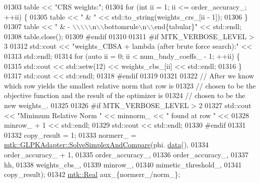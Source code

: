 \begin{DoxyCode}
{{01303     table << \textcolor{stringliteral}{"CRS weights:"};
01304     \textcolor{keywordflow}{for} (\textcolor{keywordtype}{int} ii = 1; ii <= order\_accuracy\_; ++ii) \{
01305       table << \textcolor{stringliteral}{" & "} << std::to\_string(weights\_crs\_[ii - 1]);
01306     \}
01307     table << \textcolor{stringliteral}{" & - \(\backslash\)\(\backslash\)\(\backslash\)\(\backslash\)\(\backslash\)n\(\backslash\)\(\backslash\)bottomrule\(\backslash\)n\(\backslash\)\(\backslash\)end\{tabular\}"} << std::endl;
01308     table.close();
01309 \textcolor{preprocessor}{    #endif}
01310 
01311 \textcolor{preprocessor}{    #if MTK\_VERBOSE\_LEVEL > 3}
01312     std::cout << \textcolor{stringliteral}{"weights\_CBSA + lambda (after brute force search):"} <<
01313       std::endl;
01314     \textcolor{keywordflow}{for} (\textcolor{keyword}{auto} ii = 0; ii < num\_bndy\_coeffs\_ - 1; ++ii) \{
01315       std::cout << std::setw(12) << weights\_cbs\_[ii] << std::endl;
01316     \}
01317     std::cout << std::endl;
01318 \textcolor{preprocessor}{    #endif}
01319 
01321 
01322     \textcolor{comment}{// After we know which row yields the smallest relative norm that row is}
01323     \textcolor{comment}{// chosen to be the objective function and the result of the optimizer is}
01324     \textcolor{comment}{// chosen to be the new weights\_.}
01325 
01326 \textcolor{preprocessor}{    #if MTK\_VERBOSE\_LEVEL > 2}
01327     std::cout << \textcolor{stringliteral}{"Minimum Relative Norm "} << minnorm\_ << \textcolor{stringliteral}{" found at row "} <<
01328       minrow\_ + 1 << std::endl;
01329     std::cout << std::endl;
01330 \textcolor{preprocessor}{    #endif}
01331 
01332     copy\_result = 1;
01333     normerr\_ = \hyperlink{classmtk_1_1GLPKAdapter_a834480aca83e3c0d09fdab7fdb7e8a3f}{mtk::GLPKAdapter::SolveSimplexAndCompare}(phi.
      \hyperlink{classmtk_1_1DenseMatrix_a0c33b8a9e01d157c61ddbdf807c25d84}{data}(),
01334                                                         order\_accuracy\_ + 1,
01335                                                         order\_accuracy\_,
01336                                                         order\_accuracy\_,
01337                                                         hh,
01338                                                         weights\_cbs\_,
01339                                                         minrow\_,
01340                                                         mimetic\_threshold\_,
01341                                                         copy\_result);
01342     \hyperlink{group__c01-roots_gac080bbbf5cbb5502c9f00405f894857d}{mtk::Real} aux\_\{normerr\_/norm\_\};
}}
\end{DoxyCode}

